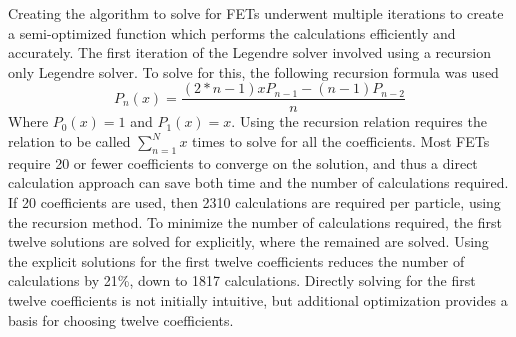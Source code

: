 \documentclass[10tma4paper]{article}
\begin{document}
Creating the algorithm to solve for FETs underwent multiple iterations to create a semi-optimized function which performs the calculations efficiently and accurately. The first iteration of the Legendre solver involved using a recursion only Legendre solver. To solve for this, the following recursion formula was used
\begin{equation}\label{recursion}
P_{n}(x) = \frac{(2*n-1)xP_{n-1}-(n-1)P_{n-2}}{n}
\end{equation}
Where $P_{0}(x)=1$ and $P_{1}(x)=x$. Using the recursion relation requires the relation to be called $\sum_{n=1}^{N}x$ times to solve for all the coefficients. Most FETs require 20 or fewer coefficients to converge on the solution, and thus a direct calculation approach can save both time and the number of calculations required. If 20 coefficients are used, then 2310 calculations are required per particle, using the recursion method. To minimize the number of calculations required, the first twelve solutions are solved for explicitly, where the remained are solved. Using the explicit solutions for the first twelve coefficients reduces the number of calculations by 21\%, down to 1817 calculations. Directly solving for the first twelve coefficients is not initially intuitive, but additional optimization provides a basis for choosing twelve coefficients.
\\
\end{document}

